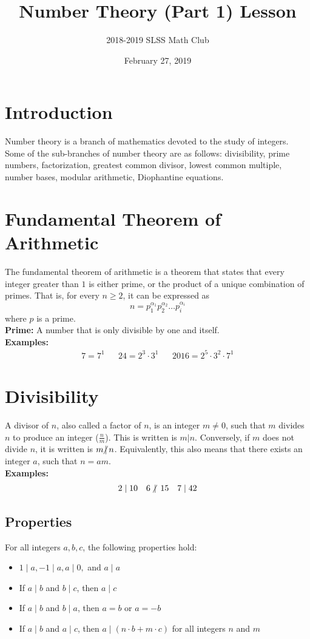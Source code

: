 \documentclass[12pt]{article}
\title{Number Theory (Part 1) Lesson\vspace{-3mm}}
\author{2018-2019 SLSS Math Club\vspace{-5mm}}
\date{February 27, 2019\vspace{-5mm}}
\newcommand{\ndiv}{\hspace{-4pt}\not|\hspace{2pt}}
\begin{document}
\maketitle

\section{Introduction}
Number theory is a branch of mathematics devoted to the study of integers. Some of the sub-branches of number theory are as follows: divisibility, prime numbers, factorization, greatest common divisor, lowest common multiple, number bases, modular arithmetic, Diophantine equations.

\section{Fundamental Theorem of Arithmetic}
The fundamental theorem of arithmetic is a theorem that states that every integer greater than $1$ is either prime, or the product of a unique combination of primes. That is, for every $n \geq 2$, it can be expressed as $$n = p_1^{\alpha_1}p_2^{\alpha_2}\dots p_i^{\alpha_i}$$ where $p$ is a prime. \\

\textbf{Prime:} A number that is only divisible by one and itself. \\

\textbf{Examples:}
\begin{align*}
    7 = 7^1  && 24 = 2^3 \cdot 3^1 && 2016 = 2^5 \cdot 3^2 \cdot 7^1 
\end{align*}

\section{Divisibility}
A divisor of $n$, also called a factor of $n$, is an integer $m \neq 0$, such that $m$ divides $n$ to produce an integer ($\frac{n}{m}$). This is written is $m | n$. Conversely, if $m$ does not divide $n$, it is written is $m \ndiv n$. Equivalently, this also means that there exists an integer $a$, such that $n = am$. \\

\textbf{Examples:}
\begin{align*}
    2\; | \; 10 && 6\; \ndiv \; 15 && 7 \; | \; 42
\end{align*}

\subsection{Properties}
For all integers $a, b, c$, the following properties hold: 
\begin{itemize}
    \item $1 \; | \; a, -1 \; | \; a, a \; | \; 0,$ and $a \; | \; a$
    \item If $a \; | \; b$ and $b \; | \; c$, then $a \; | \; c$
    \item If $a \; | \; b$ and $b  \; | \; a$, then $a = b$ or $a = -b$
    \item If $a \; | \; b$ and $a \; | \; c$, then $a  \; | \; (n \cdot b + m \cdot c)$ for all integers $n$ and $m$
\end{itemize}
\end{document}
